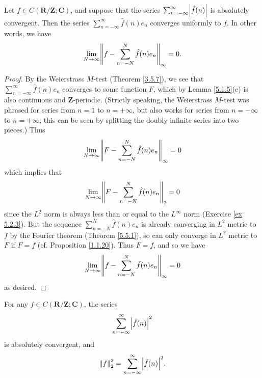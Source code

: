 \begin{theorem}\label{5.5.3}
    Let \(f \in C(\mathbf{R} / \mathbf{Z} ; \mathbf{C})\), and suppose that the series \(\sum_{n = -\infty}^\infty \abs*{\hat{f}(n)}\) is absolutely convergent.
    Then the series \(\sum_{n = -\infty}^\infty \hat{f}(n) e_n\) converges uniformly to \(f\).
    In other words, we have
    \[
        \lim_{N \to \infty} \norm*{f - \sum_{n = -N}^N \hat{f}(n) e_n}_{\infty} = 0.
    \]
\end{theorem}

\begin{proof}
    By the Weierstrass \(M\)-test (Theorem \ref{3.5.7}), we see that \(\sum_{n = -\infty}^\infty \hat{f}(n) e_n\) converges to some function \(F\), which by Lemma \ref{5.1.5}(c) is also continuous and \(\mathbf{Z}\)-periodic.
    (Strictly speaking, the Weierstrass \(M\)-test was phrased for series from \(n = 1\) to \(n = +\infty\), but also works for series from \(n = -\infty\) to \(n = +\infty\);
    this can be seen by splitting the doubly infinite series into two pieces.)
    Thus
    \[
        \lim_{N \to \infty} \norm*{F - \sum_{n = -N}^N \hat{f}(n) e_n}_{\infty} = 0
    \]
    which implies that
    \[
        \lim_{N \to \infty} \norm*{F - \sum_{n = -N}^N \hat{f}(n) e_n}_2 = 0
    \]
    since the \(L^2\) norm is always less than or equal to the \(L^\infty\) norm (Exercise \ref{ex 5.2.3}).
    But the sequence \(\sum_{n = -N}^N \hat{f}(n) e_n\) is already converging in \(L^2\) metric to \(f\) by the Fourier theorem (Theorem \ref{5.5.1}), so can only converge in \(L^2\) metric to \(F\) if \(F = f\)
    (cf. Proposition \ref{1.1.20}).
    Thus \(F = f\), and so we have
    \[
        \lim_{N \to \infty} \norm*{f - \sum_{n = -N}^N \hat{f}(n) e_n}_{\infty} = 0
    \]
    as desired.
\end{proof}

\begin{theorem}\label{5.5.4}
    For any \(f \in C(\mathbf{R} / \mathbf{Z} ; \mathbf{C})\), the series
    \[
        \sum_{n = -\infty}^\infty \abs*{\hat{f}(n)}^2
    \]
    is absolutely convergent, and
    \[
        \norm*{f}_2^2 = \sum_{n = -\infty}^\infty \abs*{\hat{f}(n)}^2.
    \]
\end{theorem}

